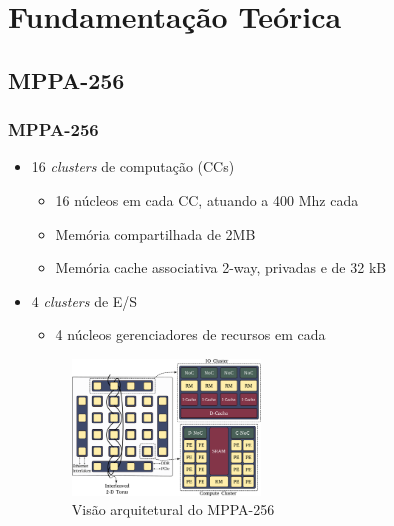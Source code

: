 \documentclass[xcolor={table}]{beamer}
\begin{document}
\section{Fundamentação Teórica}
\subsection{MPPA-256}
\begin{frame}\frametitle{MPPA-256}
    \begin{itemize}
        \item{16 \textit{clusters} de computação (CCs)}
        \begin{itemize}
            \item 16 núcleos em cada CC, atuando a 400 Mhz cada
            \item Memória compartilhada de 2MB
            \item Memória cache associativa 2-way, privadas e de 32 kB
        \end{itemize}
        \item{4 \textit{clusters} de E/S}
        \begin{itemize}
            \item 4 núcleos gerenciadores de recursos em cada
        \end{itemize}
        \begin{figure}
            \centering
            \includegraphics[width=5cm, keepaspectratio]{figs/mppa-overview.pdf}
            \caption{Visão arquitetural do MPPA-256 \cite{Penna2018}}
            \label{fig:arquiteturamppa}
        \end{figure}
    \end{itemize}
\end{frame}
\end{document}
